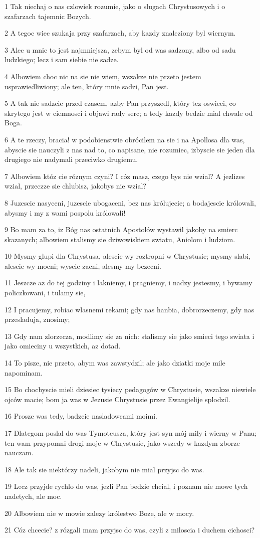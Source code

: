 \par 1 Tak niechaj o nas czlowiek rozumie, jako o slugach Chrystusowych i o szafarzach tajemnic Bozych.
\par 2 A tegoc wiec szukaja przy szafarzach, aby kazdy znaleziony byl wiernym.
\par 3 Alec u mnie to jest najmniejsza, zebym byl od was sadzony, albo od sadu ludzkiego; lecz i sam siebie nie sadze.
\par 4 Albowiem choc nic na sie nie wiem, wszakze nie przeto jestem usprawiedliwiony; ale ten, który mnie sadzi, Pan jest.
\par 5 A tak nie sadzcie przed czasem, azby Pan przyszedl, który tez oswieci, co skrytego jest w ciemnosci i objawi rady serc; a tedy kazdy bedzie mial chwale od Boga.
\par 6 A te rzeczy, bracia! w podobienstwie obrócilem na sie i na Apollosa dla was, abyscie sie nauczyli z nas nad to, co napisane, nie rozumiec, izbyscie sie jeden dla drugiego nie nadymali przeciwko drugiemu.
\par 7 Albowiem któz cie róznym czyni? I cóz masz, czego bys nie wzial? A jezlizes wzial, przeczze sie chlubisz, jakobys nie wzial?
\par 8 Juzescie nasyceni, juzescie ubogaceni, bez nas królujecie; a bodajescie królowali, abysmy i my z wami pospolu królowali!
\par 9 Bo mam za to, iz Bóg nas ostatnich Apostolów wystawil jakoby na smierc skazanych; albowiem stalismy sie dziwowiskiem swiatu, Aniolom i ludziom.
\par 10 Mysmy glupi dla Chrystusa, alescie wy roztropni w Chrystusie; mysmy slabi, alescie wy mocni; wyscie zacni, alesmy my bezecni.
\par 11 Jeszcze az do tej godziny i lakniemy, i pragniemy, i nadzy jestesmy, i bywamy policzkowani, i tulamy sie,
\par 12 I pracujemy, robiac wlasnemi rekami; gdy nas hanbia, dobrorzeczemy, gdy nas przesladuja, znosimy;
\par 13 Gdy nam zlorzecza, modlimy sie za nich: stalismy sie jako smieci tego swiata i jako omieciny u wszystkich, az dotad.
\par 14 To pisze, nie przeto, abym was zawstydzil; ale jako dziatki moje mile napominam.
\par 15 Bo chocbyscie mieli dziesiec tysiecy pedagogów w Chrystusie, wszakze niewiele ojców macie; bom ja was w Jezusie Chrystusie przez Ewangielije splodzil.
\par 16 Prosze was tedy, badzcie nasladowcami moimi.
\par 17 Dlategom poslal do was Tymoteusza, który jest syn mój mily i wierny w Panu; ten wam przypomni drogi moje w Chrystusie, jako wszedy w kazdym zborze nauczam.
\par 18 Ale tak sie niektórzy nadeli, jakobym nie mial przyjsc do was.
\par 19 Lecz przyjde rychlo do was, jezli Pan bedzie chcial, i poznam nie mowe tych nadetych, ale moc.
\par 20 Albowiem nie w mowie zalezy królestwo Boze, ale w mocy.
\par 21 Cóz chcecie? z rózgali mam przyjsc do was, czyli z miloscia i duchem cichosci?

